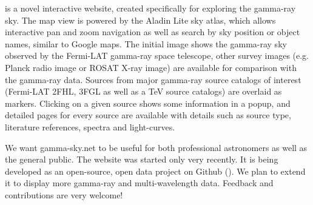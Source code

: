 \gammaskyurl is a novel interactive website, created specifically for exploring the gamma-ray sky. The map view is powered by the Aladin Lite sky atlas, which allows interactive pan and zoom navigation as well as search by sky position or object names, similar to Google maps. The initial image shows the gamma-ray sky observed by the Fermi-LAT gamma-ray space telescope, other survey images (e.g. Planck radio image or ROSAT X-ray image) are available for comparison with the gamma-ray data.
Sources from major gamma-ray source catalogs of interest (Fermi-LAT 2FHL, 3FGL as well as a TeV source catalogs) are overlaid as markers. Clicking on a given source shows some information in a popup, and detailed pages for every source are available with details such as source type, literature references, spectra and light-curves.

We want gamma-sky.net to be useful for both professional astronomers as well as the general public. The website was started only very recently. It is being developed as an open-source, open data project on Github (\gammaskygh). We plan to extend it to display more gamma-ray and multi-wavelength data. Feedback and contributions are very welcome!
